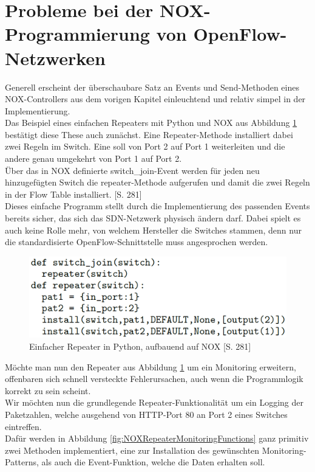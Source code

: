 \documentclass[10pt,conference]{IEEEtran}
\begin{document}
\section{Probleme bei der NOX-Programmierung von OpenFlow-Netzwerken}
Generell erscheint der überschaubare Satz an Events und Send-Methoden eines NOX-Controllers aus dem vorigen Kapitel einleuchtend und relativ simpel in der Implementierung.\\
Das Beispiel eines einfachen Repeaters mit Python und NOX aus Abbildung \ref{fig:NOXRepeaterPrimitive} bestätigt diese These auch zunächst. Eine Repeater-Methode installiert dabei zwei Regeln im Switch. Eine soll von Port 2 auf Port 1 weiterleiten und die andere genau umgekehrt von Port 1 auf Port 2.\\
Über das in NOX definierte switch\_join-Event werden für jeden neu hinzugefügten Switch die repeater-Methode aufgerufen und damit die zwei Regeln in der Flow Table installiert. \cite{4}[S. 281]\\
Dieses einfache Programm stellt durch die Implementierung des passenden Events bereits sicher, das sich das SDN-Netzwerk physisch ändern darf. Dabei spielt es auch keine Rolle mehr, von welchem Hersteller die Switches stammen, denn nur die standardisierte OpenFlow-Schnittstelle muss angesprochen werden.
\begin{figure}[h]
	\centering
	\includegraphics[width=\columnwidth]{images/NOXRepeaterPrimitive.PNG}
	\caption{Einfacher Repeater in Python, aufbauend auf NOX \cite{4}[S. 281]}
	\label{fig:NOXRepeaterPrimitive}
\end{figure}
\newline
Möchte man nun den Repeater aus Abbildung \ref{fig:NOXRepeaterPrimitive} um ein Monitoring erweitern, offenbaren sich schnell versteckte Fehlerursachen, auch wenn die Programmlogik korrekt zu sein scheint.\\
Wir möchten nun die grundlegende Repeater-Funktionalität um ein Logging der Paketzahlen, welche ausgehend von HTTP-Port 80 an Port 2 eines Switches eintreffen.\\
Dafür werden in Abbildung \ref{fig:NOXRepeaterMonitoringFunctions} ganz primitiv zwei Methoden implementiert, eine zur Installation des gewünschten Monitoring-Patterns, als auch die Event-Funktion, welche die Daten erhalten soll.\\
\end{document}
